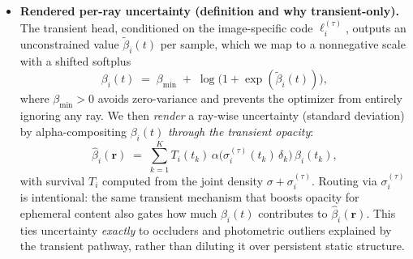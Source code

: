 \begin{enrichment}
\begin{enrichment}
\begin{itemize}[leftmargin=*,itemsep=0.25em]
            \item \textbf{Rendered per-ray uncertainty (definition and why transient-only).}
            The transient head, conditioned on the image-specific code \(\ell^{(\tau)}_i\), outputs an unconstrained value \(\tilde{\beta}_i(t)\) per sample, which we map to a nonnegative scale with a shifted softplus
            \[
            \beta_i(t)\;=\;\beta_{\min}\;+\;\log\!\big(1+\exp(\tilde{\beta}_i(t))\big),
            \]
            where \(\beta_{\min}>0\) avoids zero-variance and prevents the optimizer from entirely ignoring any ray. We then \emph{render} a ray-wise uncertainty (standard deviation) by alpha-compositing \(\beta_i(t)\) \emph{through the transient opacity}:
            \begin{equation}
                \label{eq:nerfw_rendered_beta}
                \hat{\beta}_i(\mathbf{r})
                \;=\;
                \sum_{k=1}^{K} T_i(t_k)\,\alpha\!\big(\sigma^{(\tau)}_i(t_k)\,\delta_k\big)\,\beta_i(t_k),
            \end{equation}
            with survival \(T_i\) computed from the joint density \(\sigma+\sigma^{(\tau)}_i\).
            Routing via \(\sigma^{(\tau)}_i\) is intentional: the same transient mechanism that boosts opacity for ephemeral content also gates how much \(\beta_i(t)\) contributes to \(\hat{\beta}_i(\mathbf{r})\). This ties uncertainty \emph{exactly} to occluders and photometric outliers explained by the transient pathway, rather than diluting it over persistent static structure.
            

\end{itemize}
\end{enrichment}
\end{enrichment}
